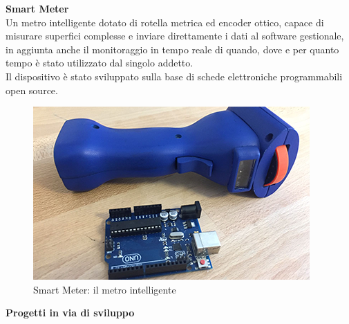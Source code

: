 \noindent \textbf{Smart Meter}
\\
Un metro intelligente dotato di rotella metrica ed encoder ottico, capace di misurare superfici complesse e inviare direttamente i dati al software gestionale, in aggiunta anche il monitoraggio in tempo reale di quando, dove e per quanto tempo è stato utilizzato dal singolo addetto.\\
Il dispositivo è stato sviluppato sulla base di schede elettroniche programmabili open source.
\\
\begin{figure}[H]
	\begin{center}
	\includegraphics[scale=0.6]{immagini/smartmeter.png}
	\caption{Smart Meter: il metro intelligente}
	\end{center}
\end{figure}

\noindent \textbf{Progetti in via di sviluppo}
\\

